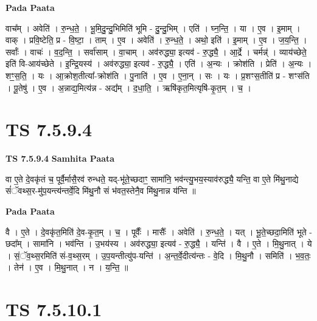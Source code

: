 \documentclass[17pt]{extarticle}
\begin{document}
\textbf{Pada Paata} \newline

वाच᳚म् । अवेति॑ । रु॒न्ध॒ते॒ । भू॒मि॒दु॒न्दु॒भिमिति॑ भूमि - दु॒न्दु॒भिम् । एति॑ । घ्न॒न्ति॒ । या । ए॒व । इ॒माम् । वाक् । प्रवि॒ष्टेति॒ प्र - वि॒ष्टा॒ । ताम् । ए॒व । अवेति॑ । रु॒न्ध॒ते॒ । अथो॒ इति॑ । इ॒माम् । ए॒व । ज॒य॒न्ति॒ । सर्वाः᳚ । वाचः॑ । व॒द॒न्ति॒ । सर्वा॑साम् । वा॒चाम् । अव॑रुद्ध्या॒ इत्यव॑ - रु॒द्ध्यै॒ । आ॒र्द्रे । चर्मन्न्॑ । व्याय॑च्छेते॒ इति॑ वि-आय॑च्छेते । इ॒न्द्रि॒यस्य॑ । अव॑रुद्ध्या॒ इत्यव॑ - रु॒द्ध्यै॒ । एति॑ । अ॒न्यः । क्रोश॑ति । प्रेति॑ । अ॒न्यः । शꣳ॒॒स॒ति॒ । यः । आ॒क्रोश॒तीत्या᳚-क्रोश॑ति । पु॒नाति॑ । ए॒व । ए॒ना॒न् । सः । यः । प्र॒शꣳस॒तीति॑ प्र - शꣳस॑ति । पू॒तेषु॑ । ए॒व । अ॒न्नाद्य॒मित्य॑न्न - अद्य᳚म् । द॒धा॒ति॒ । ऋषि॑कृत॒मित्यृषि॑-कृ॒त॒म् । च॒ ।  \newline




\section*{ TS 7.5.9.4 }

\textbf{TS 7.5.9.4 } \newline
\textbf{Samhita Paata} \newline

वा ए॒ते दे॒वकृ॑तं च॒ पूर्वै॒र्मासै॒रव॑ रुन्धते॒ यद्-भू॑ते॒च्छदाꣳ॒॒ सामा॑नि॒ भव॑न्त्यु॒भय॒स्याव॑रुद्ध्यै॒ यन्ति॒ वा ए॒ते मि॑थु॒नाद्ये सं॑ॅवथ्स॒र-मु॑प॒यन्त्य॑न्तर्वे॒दि मि॑थु॒नौ सं भ॑वत॒स्तेनै॒व मि॑थु॒नान्न य॑न्ति ॥ \newline

\textbf{Pada Paata} \newline

वै । ए॒ते । दे॒वकृ॑त॒मिति॑ दे॒व-कृ॒त॒म् । च॒ । पूर्वैः᳚ । मासैः᳚ । अवेति॑ । रु॒न्ध॒ते॒ । यत् । भू॒ते॒च्छदा॒मिति॑ भूते - छदा᳚म् । सामा॑नि । भव॑न्ति । उ॒भय॑स्य । अव॑रुद्ध्या॒ इत्यव॑ - रु॒द्ध्यै॒ । यन्ति॑ । वै । ए॒ते । मि॒थु॒नात् । ये । सं॒ॅव॒थ्स॒रमिति॑ सं-व॒थ्स॒रम् । उ॒प॒यन्तीत्यु॑प-यन्ति॑ । अ॒न्त॒र्वे॒दीत्य॑न्तः - वे॒दि । मि॒थु॒नौ । समिति॑ । भ॒व॒तः॒ । तेन॑ । ए॒व । मि॒थु॒नात् । न । य॒न्ति॒ ॥  \newline




\section*{ TS 7.5.10.1 }
\end{document}
